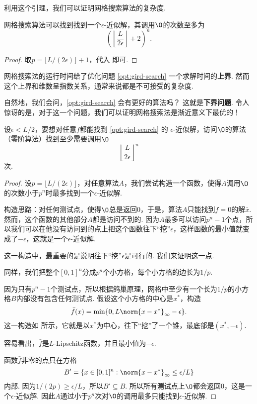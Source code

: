 利用这个引理，我们可以证明网格搜索算法的复杂度.
\begin{theorem}
    网格搜索算法可以找到找到一个$\epsilon$-近似解，其调用$\O$的次数至多为
    \[\left(\left\lfloor\frac{L}{2\epsilon}\right\rfloor+2\right)^n.\]
\end{theorem}
\begin{proof}
    取$p=\lfloor L/(2\epsilon)\rfloor+1$，代入 即可.
\end{proof}

网格搜索法的运行时间给了优化问题 \eqref{opt:gird-search} 一个求解时间的\textbf{上界}. 然而这个上界和维数呈指数关系，通常来说都是不可接受的复杂度. 

自然地，我们会问，\eqref{opt:gird-search} 会有更好的算法吗？ 这就是\textbf{下界问题}. 令人惊讶的是，对于这一个问题，我们可以证明网格搜索法是渐近意义下最优的！

\begin{theorem}\label{thm:gird-search-lower-bound}
    设$\epsilon<L/2$，要想对任意$f$都能找到 \eqref{opt:gird-search} 的 $\epsilon$-近似解，访问$\O$的算法（零阶算法）找到至少需要调用$\O$
    \[\left\lfloor\frac{L}{2\epsilon}\right\rfloor^n\]
    次.
\end{theorem}
\begin{proof}
设$p=\lfloor L/(2\epsilon)\rfloor$，对任意算法$A$，我们尝试构造一个函数，使得$A$调用$\O$的次数小于$p^n$时最多找到一个$\epsilon$-近似解.

构造思路：对任何测试点，使得$\O$总是返回$0$，于是，算法$A$只能找到$f=0$的解$\bar{x}$. 然而，这个函数的其他部分$A$都是访问不到的. 因为$A$最多可以访问$p^n-1$个点，所以我们可以在他没有访问到的点上把这个函数往下“挖”$\epsilon$，这样函数的最小值就变成了$-\epsilon$，这就是一个$\epsilon$-近似解.

这一构造中，最重要的是说明往下“挖”$\epsilon$是可行的. 我们来证明这一点.

同样，我们把整个$[0,1]^n$分成$p^n$个小方格，每个小方格的边长为$1/p$. 

因为只有$p^n-1$个测试点，所以根据鸽巢原理，网格中至少有一个长为$1/p$的小方格$B$内部没有包含任何测试点. 假设这个小方格的中心是$x^*$，构造
    \[\bar f(x)=\min\{0,L\norm{x-x^*}_\infty-\epsilon\}.\]
这一构造如 所示，它就是以$x^*$为中心，往下“挖”了一个锥，最底部是$(x^*,-\epsilon)$.

容易看出，$\bar f$是$L$-Lipschitz函数，并且最小值为$-\epsilon$.

函数$\bar f$非零的点只在方格
    \[B'=\{x\in[0,1]^n:\norm{x-x^*}_\infty\leq\epsilon/L\}\]
内部. 因为$1/(2p)\geq \epsilon/L$，所以$B'\subseteq B$. 所以所有测试点上$\O$都会返回$0$，这是一个$\epsilon$-近似解. 因此$A$通过小于$p^n$次对$\O$的调用最多只能找到$\epsilon$-近似解.
\end{proof}

